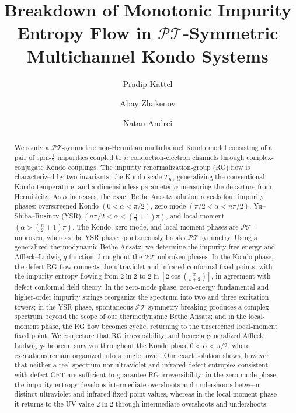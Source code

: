 \documentclass[aps,  prb,twocolumn,
  superscriptaddress,  floatfix,  10pt         
]{revtex4-2}
\begin{document}
\title{Breakdown of Monotonic Impurity Entropy Flow in $\mathscr{PT}$-Symmetric Multichannel Kondo Systems}

\author{Pradip Kattel}

\author{Abay Zhakenov}
\author{Natan Andrei}

\begin{abstract}
We study a $\mathscr{PT}$-symmetric  non-Hermitian multichannel Kondo model consisting of a pair of spin-$\frac12$ impurities coupled to $n$ conduction-electron channels through complex-conjugate Kondo couplings. The impurity renormalization-group (RG) flow is characterized by two invariants: the Kondo scale $T_K$, generalizing the conventional Kondo temperature, and a dimensionless parameter $\alpha$ measuring the departure from Hermiticity. As $\alpha$ increases, the exact Bethe Ansatz solution reveals four impurity phases: overscreened Kondo $(0<\alpha<\pi/2)$, zero mode $(\pi/2<\alpha<n\pi/2)$, Yu--Shiba--Rusinov (YSR) $(n\pi/2<\alpha<(\frac{n}{2}+1)\pi)$, and local moment $(\alpha>(\frac{n}{2}+1)\pi)$. The Kondo, zero-mode, and local-moment phases are $\mathscr{PT}$-unbroken, whereas the YSR phase spontaneously breaks $\mathscr{PT}$ symmetry. Using a generalized thermodynamic Bethe Ansatz, we determine the impurity free energy and Affleck--Ludwig $g$-function throughout the $\mathscr{PT}$-unbroken phases. In the Kondo phase, the defect RG flow connects the ultraviolet and infrared conformal fixed points, with the impurity entropy flowing from $2\ln2$ to $2\ln\left[2\cos\left(\frac{\pi}{n+2}\right)\right]$, in agreement with defect conformal field theory. In the zero-mode phase, zero-energy fundamental and higher-order impurity strings reorganize the spectrum into two and three excitation towers; in the YSR phase, spontaneous $\mathscr{PT}$ symmetry breaking produces a complex spectrum beyond the scope of our thermodynamic Bethe Ansatz; and in the local-moment phase, the RG flow becomes cyclic, returning to the unscreened local-moment fixed point. We conjecture that RG irreversibility, and hence a generalized Affleck--Ludwig $g$-theorem, survives throughout the Kondo phase $0<\alpha<\pi/2$, where excitations remain organized into a single tower. Our exact solution shows, however, that neither a real spectrum nor ultraviolet and infrared defect entropies consistent with defect CFT are sufficient to guarantee RG irreversibility: in the zero-mode phase, the impurity entropy develops intermediate overshoots and undershoots between distinct ultraviolet and infrared fixed-point values, whereas in the local-moment phase it returns to the UV value $2\ln2$ through intermediate overshoots and undershoots.
\end{abstract}
\end{document}
